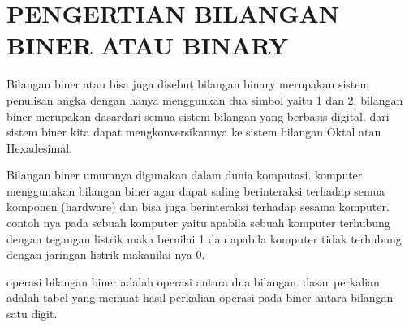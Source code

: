 \section{PENGERTIAN BILANGAN BINER ATAU BINARY}

Bilangan biner atau bisa juga disebut bilangan binary merupakan sistem penulisan angka dengan hanya menggunkan dua simbol 
yaitu 1 dan 2. bilangan biner merupakan dasardari semua sistem bilangan yang berbasis digital. dari sistem biner kita dapat 
mengkonversikannya ke sistem bilangan Oktal atau Hexadesimal.

Bilangan biner umumnya digunakan dalam dunia komputasi. komputer menggunakan bilangan biner agar dapat saling berinteraksi 
terhadap semua komponen (hardware) dan bisa juga berinteraksi terhadap sesama komputer. contoh nya pada sebuah komputer yaitu 
apabila sebuah komputer terhubung dengan tegangan listrik maka bernilai 1 dan apabila komputer tidak terhubung dengan jaringan 
listrik makanilai nya 0.

operasi bilangan biner  adalah operasi antara dua bilangan. dasar perkalian adalah tabel yang memuat hasil perkalian operasi 
pada biner antara bilangan satu digit.
